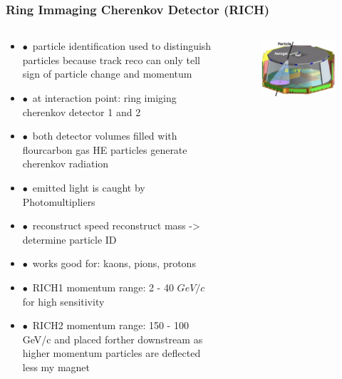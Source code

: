 \documentclass[aspectratio=1610, 12pt, xcolor=dvipsnames]{beamer}
\begin{document}
\begin{frame}\frametitle{Ring Immaging Cherenkov Detector (RICH)}
  \begin{columns}
    \begin{column}[c]{0.48\textwidth}
      \begin{itemize}
        \item $\bullet$\, particle identification used to distinguish particles because track reco can only tell sign of particle change and momentum
        \item $\bullet$\, at interaction point: ring imiging cherenkov detector 1 and 2
        \item $\bullet$\, both detector volumes filled with flourcarbon gas \to HE particles generate cherenkov radiation
        \item $\bullet$\, emitted light is caught by Photomultipliers
        \item $\bullet$\, \to reconstruct speed \to reconstruct mass -> determine particle ID
        \item $\bullet$\, works good for: kaons, pions, protons
        \item $\bullet$\, RICH1 momentum range: 2 - 40 $GeV/c$ for high sensitivity
        \item $\bullet$\, RICH2 momentum range: 150 - 100 GeV/c and placed forther downstream as higher momentum particles are deflected less my magnet
      \end{itemize}
    \end{column}
    \begin{column}[c]{0.48\textwidth}
      \begin{figure}
	\centering
	\includegraphics[width=\textwidth]{plots/rich1.png}
      \end{figure}
    \end{column}
  \end{columns}
\end{frame}
\end{document}
